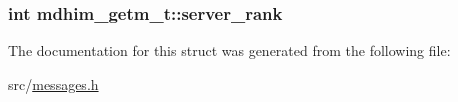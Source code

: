 \hypertarget{structmdhim__getm__t_a2fe10e46b27b008657d3c59299ea1fd6}{
\subsubsection[{server\-\_\-rank}]{\setlength{\rightskip}{0pt plus 5cm}int mdhim\-\_\-getm\-\_\-t\-::server\-\_\-rank}}\label{d9/d54/structmdhim__getm__t_a2fe10e46b27b008657d3c59299ea1fd6}


The documentation for this struct was generated from the following file\-:\begin{DoxyCompactItemize}
\item 
src/\hyperlink{messages_8h}{messages.\-h}\end{DoxyCompactItemize}
